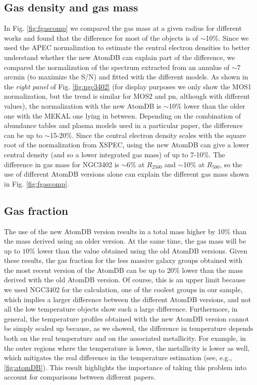 \documentclass{aa} %
\begin{document}
\begin{appendix}
\subsection{Gas density and gas mass}	
In Fig. \ref{fig:fgascomp} we compared the gas mass at a given radius
for different works and found that the difference for most of
the objects is of $\sim$10$\%$. Since we used the APEC normalization
to estimate the central electron densities to better understand whether
the new AtomDB can explain part of the difference, we compared the
normalization of the spectrum extracted from an annulus of $\sim$7
arcmin (to maximize the S/N) and fitted with the different models. As
shown in the {\it right panel} of Fig. \ref{fig:ngc3402} (for display
purposes we only show the MOS1 normalization, but the trend is similar
 for MOS2 and pn, although with different values), the normalization
with the new AtomDB is $\sim$10$\%$ lower than the older one with the
MEKAL one lying in between. Depending on the combination of abundance
tables and plasma models used in a particular paper, the difference can
be up to $\sim$15-20$\%$. Since the central electron density scales
with the square root of the normalization from XSPEC, using the new
AtomDB can give a lower central density (and so a lower integrated gas
mass) of up to 7-10$\%$. The difference in gas mass for NGC3402 is
$\sim$6$\%$ at $R_{2500}$ and $\sim$10$\%$ at $R_{500}$, so the use of
different AtomDB versions alone can explain the different gas mass
shown in Fig. \ref{fig:fgascomp}.

\subsection{Gas fraction}
The use of the new AtomDB version results in a total mass higher by 10$\%$ than the mass derived using an older version. At the same time, the gas mass will be up to $10\%$ lower than the value obtained using the old AtomDB versions. Given these results, the gas fraction for the less massive galaxy groups obtained with the most recent version of the AtomDB can be up to 20$\%$ lower than the mass derived with the old AtomDB version. Of course, this is an upper limit because we used NGC3402 for the calculation, one of the coolest groups in our sample, which implies a larger difference between the different AtomDB versions, and not all the low temperature objects show such a large difference. Furthermore, in general, the temperature profiles obtained with the new AtomDB version cannot be simply scaled up because, as we showed, the difference in temperature depends both on the real temperature and on the associated metallicity. For example, in the outer regions where the temperature is lower, the metallicity is lower as well, which mitigates the real difference in the temperature estimation (see, e.g., \ref{fig:atomDB}). This result highlights the
importance of taking this problem into account for comparisons between
different papers.



\end{appendix}
\end{document}
